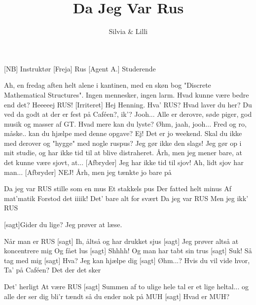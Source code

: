 \documentclass[a4paper,11pt]{article}
\title{Da Jeg Var Rus}
\author{Silvia \& Lilli}
\begin{document}
\maketitle

\begin{roles}
[NB] Instruktør
[Freja] Rus
[Agent A.] Studerende
\end{roles}

\begin{song}

 Ah, en fredag aften helt alene i kantinen, med en skøn bog "Discrete Mathematical Structures". Ingen mennesker, ingen larm. Hvad kunne være bedre end det?
 Heeeeej RUS!
[Irriteret] Hej Henning.
 Hva' RUS? Hvad laver du her? Du ved da godt at der er fest på Caféen?, ik'?
 Jooh...
 Alle er derovre, søde piger, god musik og masser af GT. Hvad mere kan du lyste?
 Øhm, jaah, jooh... Fred og ro, måske.. kan du hjælpe med denne opgave?
 Ej! Det er jo weekend. Skal du ikke med derover og "hygge"  med nogle ruspus?
 Jeg gør ikke den slags! Jeg gør op i mit studie, og har ikke tid til at blive distraheret.
 Årh, men jeg mener bare, at det kunne være sjovt, at...
[Afbryder] Jeg har ikke tid til sjov!
 Ah, lidt sjov har man...
[Afbryder] NEJ!
 Årh, men jeg tænkte jo bare på
   
Da jeg var RUS 
 stille som en mus
   Et stakkels pus 
   Der fatted helt minus
   Af mat'matik
   Forstod det iiiik!
   Det' bare alt for svært
   Da jeg var RUS
   Men jeg ikk' RUS

[sagt]Gider du lige? Jeg prøver at læse.

 Når man er RUS
[sagt] Ih, åltså
 og har drukket sjus%
[sagt] Jeg prøver altså at koncentrere mig
 Og fået lus %
[sagt] Shhhh!
 Og man har tabt sin trus %
[sagt] Suk!
 Så tag med mig %
[sagt] Hva?
 Jeg kan hjælpe dig %
[sagt] Øhm...?
 Hvis du vil vide hvor,
   Ta' på Caféen?
   Det der det sker

   Det' herligt
   At være RUS
[sagt] Summen af to ulige hele tal er et lige heltal...
 og alle der ser dig bli'r tændt
 så du ender nok på MUH
[sagt] Hvad er MUH?


\end{song}
\end{document}
